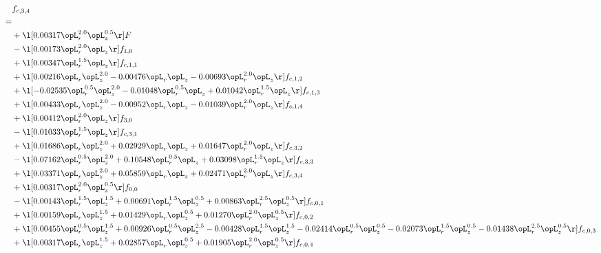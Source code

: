 \begin{alignat}{2} 
\label{eq:f_34_1} 
& f_{c,3,4} \nonumber \\ 
 = \\ 
& + \l[  0.00317 \opL_r^{2.0} \opL_z^{0.5}  \r] F \nonumber \\ 
& - \l[  0.00173 \opL_r^{2.0} \opL_z  \r] f_{1,0} \nonumber \\ 
& + \l[  0.00347 \opL_r^{1.5} \opL_z  \r] f_{c,1,1} \nonumber \\ 
& + \l[  0.00216 \opL_r \opL_z^{2.0}   -0.00476 \opL_r \opL_z   -0.00693 \opL_r^{2.0} \opL_z  \r] f_{c,1,2} \nonumber \\ 
& + \l[  -0.02535 \opL_r^{0.5} \opL_z^{2.0}   -0.01048 \opL_r^{0.5} \opL_z +  0.01042 \opL_r^{1.5} \opL_z  \r] f_{c,1,3} \nonumber \\ 
& + \l[  0.00433 \opL_r \opL_z^{2.0}   -0.00952 \opL_r \opL_z   -0.01039 \opL_r^{2.0} \opL_z  \r] f_{c,1,4} \nonumber \\ 
& + \l[  0.00412 \opL_r^{2.0} \opL_z  \r] f_{3,0} \nonumber \\ 
& - \l[  0.01033 \opL_r^{1.5} \opL_z  \r] f_{c,3,1} \nonumber \\ 
& + \l[  0.01686 \opL_r \opL_z^{2.0} +  0.02929 \opL_r \opL_z +  0.01647 \opL_r^{2.0} \opL_z  \r] f_{c,3,2} \nonumber \\ 
& - \l[  0.07162 \opL_r^{0.5} \opL_z^{2.0} +  0.10548 \opL_r^{0.5} \opL_z +  0.03098 \opL_r^{1.5} \opL_z  \r] f_{c,3,3} \nonumber \\ 
& + \l[  0.03371 \opL_r \opL_z^{2.0} +  0.05859 \opL_r \opL_z +  0.02471 \opL_r^{2.0} \opL_z  \r] f_{c,3,4} \nonumber \\ 
& + \l[  0.00317 \opL_r^{2.0} \opL_z^{0.5}  \r] f_{0,0} \nonumber \\ 
& - \l[  0.00143 \opL_r^{1.5} \opL_z^{1.5} +  0.00691 \opL_r^{1.5} \opL_z^{0.5} +  0.00863 \opL_r^{2.5} \opL_z^{0.5}  \r] f_{c,0,1} \nonumber \\ 
& + \l[  0.00159 \opL_r \opL_z^{1.5} +  0.01429 \opL_r \opL_z^{0.5} +  0.01270 \opL_r^{2.0} \opL_z^{0.5}  \r] f_{c,0,2} \nonumber \\ 
& + \l[  0.00455 \opL_r^{0.5} \opL_z^{1.5} +  0.00926 \opL_r^{0.5} \opL_z^{2.5}   -0.00428 \opL_r^{1.5} \opL_z^{1.5}   -0.02414 \opL_r^{0.5} \opL_z^{0.5}   -0.02073 \opL_r^{1.5} \opL_z^{0.5}   -0.01438 \opL_r^{2.5} \opL_z^{0.5}  \r] f_{c,0,3} \nonumber \\ 
& + \l[  0.00317 \opL_r \opL_z^{1.5} +  0.02857 \opL_r \opL_z^{0.5} +  0.01905 \opL_r^{2.0} \opL_z^{0.5}  \r] f_{c,0,4} \nonumber \\ 

\end{alignat}
